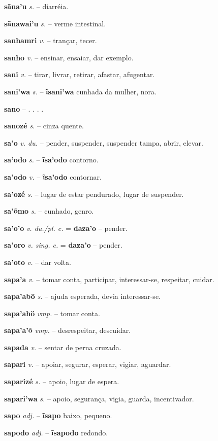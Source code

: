 \textbf{sãna'u} \textit{s.} -- diarréia.

\textbf{sãnawai'u} \textit{s.} -- verme intestinal.

\textbf{sanhamri} \textit{v.} -- trançar, tecer.

\textbf{sanho} \textit{v.} -- ensinar, ensaiar, dar exemplo.

\textbf{sani} \textit{v.} -- tirar, livrar, retirar, afastar, afugentar.

\textbf{sani'wa} \textit{s.} -- \textbf{ĩsani'wa} cunhada da mulher, nora.

\textbf{sano} \textit{} -- . . . .

\textbf{sanozé} \textit{s.} -- cinza quente.

\textbf{sa'o} \textit{v. du.} -- pender, suspender, suspender tampa, abrir, elevar.

\textbf{sa'odo} \textit{s.} -- \textbf{ĩsa'odo} contorno.

\textbf{sa'odo} \textit{v.} -- \textbf{ĩsa'odo} contornar.

\textbf{sa'ozé} \textit{s.} -- lugar de estar pendurado, lugar de suspender.

\textbf{sa'õmo} \textit{s.} -- cunhado, genro.

\textbf{sa'o'o} \textit{v. du./pl. c.} = \textbf{daza'o} -- pender.

\textbf{sa'oro} \textit{v. sing. c.} = \textbf{daza'o} -- pender.

\textbf{sa'oto} \textit{v.} -- dar volta.

\textbf{sapa'a} \textit{v.} -- tomar conta, participar, interessar-se, respeitar, cuidar.

\textbf{sapa'abö} \textit{s.} -- ajuda esperada, devia interessar-se.

\textbf{sapa'ahö} \textit{vmp.} -- tomar conta.

\textbf{sapa'a'õ} \textit{vmp.} -- desrespeitar, descuidar.

\textbf{sapada} \textit{v.} -- sentar de perna cruzada.

\textbf{sapari} \textit{v.} -- apoiar, segurar, esperar, vigiar, aguardar.

\textbf{saparizé} \textit{s.} -- apoio, lugar de espera.

\textbf{sapari'wa} \textit{s.} -- apoio, segurança, vigia, guarda, incentivador.

\textbf{sapo} \textit{adj.} -- \textbf{ĩsapo} baixo, pequeno.

\textbf{sapodo} \textit{adj.} -- \textbf{ĩsapodo} redondo.

